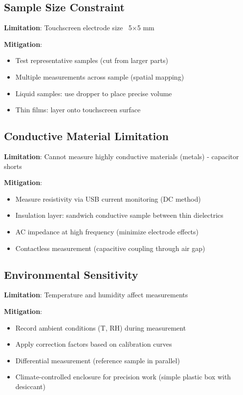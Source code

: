 \documentclass[12pt,a4paper]{article}
\begin{document}
\subsection{Sample Size Constraint}

\textbf{Limitation}: Touchscreen electrode size ~5×5 mm

\textbf{Mitigation}:
\begin{itemize}
\item Test representative samples (cut from larger parts)
\item Multiple measurements across sample (spatial mapping)
\item Liquid samples: use dropper to place precise volume
\item Thin films: layer onto touchscreen surface
\end{itemize}

\subsection{Conductive Material Limitation}

\textbf{Limitation}: Cannot measure highly conductive materials (metals) - capacitor shorts

\textbf{Mitigation}:
\begin{itemize}
\item Measure resistivity via USB current monitoring (DC method)
\item Insulation layer: sandwich conductive sample between thin dielectrics
\item AC impedance at high frequency (minimize electrode effects)
\item Contactless measurement (capacitive coupling through air gap)
\end{itemize}

\subsection{Environmental Sensitivity}

\textbf{Limitation}: Temperature and humidity affect measurements

\textbf{Mitigation}:
\begin{itemize}
\item Record ambient conditions (T, RH) during measurement
\item Apply correction factors based on calibration curves
\item Differential measurement (reference sample in parallel)
\item Climate-controlled enclosure for precision work (simple plastic box with desiccant)
\end{itemize}
\end{document}
